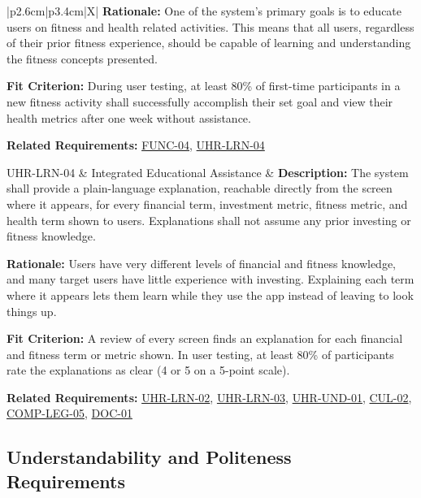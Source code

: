 \documentclass[12pt]{article}
\begin{document}
\begin{xltabular}{\textwidth}{|p{2.6cm}|p{3.4cm}|X|}
\textbf{Rationale:} One of the system's primary goals is to educate users on fitness and health related activities. This means that all users, regardless of their prior fitness experience, should be capable of learning and understanding the fitness concepts presented.

\textbf{Fit Criterion:} During user testing, at least 80\% of first-time participants in a new fitness activity shall successfully accomplish their set goal and view their health metrics after one week without assistance.

\textbf{Related Requirements:} \hyperlink{req:FUNC-04}{FUNC-04}, \hyperlink{req:UHR-LRN-04}{UHR-LRN-04}\\
\hline

UHR-LRN-04\hypertarget{req:UHR-LRN-04}{} &
Integrated Educational Assistance &
\textbf{Description:} The system shall provide a plain-language explanation, reachable directly from the screen where it appears, for every financial term, investment metric, fitness metric, and health term shown to users. Explanations shall not assume any prior investing or fitness knowledge.

\textbf{Rationale:} Users have very different levels of financial and fitness knowledge, and many target users have little experience with investing. Explaining each term where it appears lets them learn while they use the app instead of leaving to look things up.

\textbf{Fit Criterion:} A review of every screen finds an explanation for each financial and fitness term or metric shown. In user testing, at least 80\% of participants rate the explanations as clear (4 or 5 on a 5-point scale).

\textbf{Related Requirements:} \hyperlink{req:UHR-LRN-02}{UHR-LRN-02}, \hyperlink{req:UHR-LRN-03}{UHR-LRN-03}, \hyperlink{req:UHR-UND-01}{UHR-UND-01}, \hyperlink{req:CUL-02}{CUL-02}, \hyperlink{req:COMP-LEG-05}{COMP-LEG-05}, \hyperlink{req:DOC-01}{DOC-01}\\
\hline

\end{xltabular}

\subsection{Understandability and Politeness Requirements}
\end{document}
